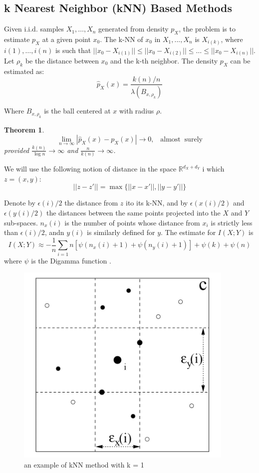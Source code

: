 \documentclass{article}
\newtheorem{thm}{Theorem}
\begin{document}
	\subsection{k Nearest Neighbor (kNN) Based Methods}
	
	Given  i.i.d. samples ${X_1,\dots,X_n}$ generated from density $p_X$, the problem is to estimate $p_X$ at  a  given  point $x_0$.  The k-NN of $x_0$ in ${X_1,...,X_n}$ is $X_{i(k)}$, where $i(1),\dots,i(n)$  is  such  that $||x_0-X_{i(1)}|| \leq ||x_0-X_{i(2)}|| \leq \dots \leq ||x_0-X_{i(n)}||$. Let $\rho_k$ be the distance between $x_0$ and the k-th  neighbor. The density $p_X$ can be estimated as:
	$$\hat{p}_X(x) = \frac{k(n)/n}{\lambda(B_{x, \rho_k})}$$
	
	Where $B_{x, \rho_k}$ is the ball centered at $x$ with radius $\rho$.
	\begin{thm}
		$$\lim_{n \to \infty} |\hat{p}_X(x) - p_X(x)| \to 0, \;\;\; \mathrm{almost\;\;surely}$$ provided $\frac{k(n)}{\log n} \to \infty$ and $\frac{n}{k(n)} \to \infty$.
	\end{thm}

	We will use the following notion of distance in the space $\mathbb{R}^{d_X + d_Y}$ i which $z = (x, y)$:
	$$||z-z'|| = \max\{||x-x'||, ||y-y'||\}$$
	
	Denote by $\epsilon(i)/2$ the distance from $z$ ito its k-NN, and by $\epsilon(x(i)/2)$ and $\epsilon (y(i)/2)$ the distances between the same points projected into the $X$ and $Y$ sub-spaces. $n_x(i)$ is the number of points whose distance from $x_i$ is strictly less than $\epsilon(i)/2$, andn $y(i)$ is similarly defined for $y$. The estimate for $I(X;Y)$ is
	$$I( X;Y) \approx -\frac{1}{n} \sum_{i = 1}{n} [\psi(n_x(i) + 1) + \psi(n_y(i) + 1)]  + \psi(k) + \psi(n)$$
	where $\psi$ is the Digamma function \cite{cellucci2005statistical}.
	
	\begin{figure}[h!]
		\centering
		\includegraphics[scale=0.5]{knn.png}
		\caption{an example of kNN method with k = 1}
	\end{figure}
	
\end{document}
